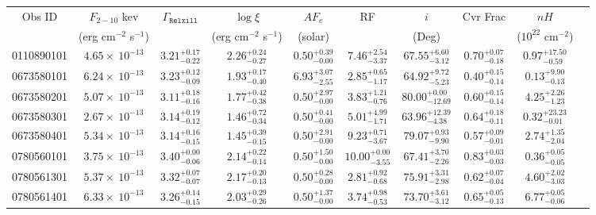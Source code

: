 \documentclass{article}
\begin{document}
\begin{landscape}
\begin{longtable}{cccccccccl}
\hline \multicolumn{1}{c}{Obs ID} & \multicolumn{1}{c}{$F_{2-10}$ kev} & \multicolumn{1}{c}{$\Gamma_\texttt{Relxill}$} & \multicolumn{1}{c}{$\log \xi$} & \multicolumn{1}{c}{$AF_e$} & \multicolumn{1}{c}{RF} & \multicolumn{1}{c}{$\textit{i}$} & \multicolumn{1}{c}{Cvr Frac} & \multicolumn{1}{c}{$nH$}\\  
\multicolumn{1}{c}{} & \multicolumn{1}{c}{(erg cm$^{-2}$ s$^{-1}$)} & \multicolumn{1}{c}{} & \multicolumn{1}{c}{(erg cm$^{-2}$ s$^{-1}$)} & \multicolumn{1}{c}{(solar)} & \multicolumn{1}{c}{} & \multicolumn{1}{c}{(Deg)} & \multicolumn{1}{c}{} & \multicolumn{1}{l}{($10^{22}$ cm$^{-2}$)}\\ \hline 
0110890101 & $4.65 \times~10^{-13}$ & $3.21^{+0.17}_{-0.22}$ & $2.26^{+0.24}_{-0.27}$ & $0.50^{+0.39}_{-0.00}$ & $7.46^{+2.54}_{-3.37}$ & $67.55^{+6.60}_{-3.12}$ &  $0.70^{+0.07}_{-0.18}$ &  $0.97^{+17.50}_{-0.59}$\\
0673580101 & $6.24 \times~10^{-13}$ & $3.23^{+0.12}_{-0.09}$ & $1.93^{+0.17}_{-0.40}$ & $6.93^{+3.07}_{-2.55}$ & $2.85^{+0.65}_{-1.17}$ & $64.92^{+9.72}_{-5.23}$ &  $0.40^{+0.15}_{-0.14}$ &  $0.13^{+9.90}_{-0.13}$\\
0673580201 & $5.07 \times~10^{-13}$ & $3.11^{+0.18}_{-0.16}$ & $1.77^{+0.42}_{-0.38}$ & $0.50^{+2.97}_{-0.00}$ & $3.83^{+1.21}_{-0.76}$ & $80.00^{+0.00}_{-12.69}$ &  $0.60^{+0.15}_{-0.14}$  &  $4.25^{+2.26}_{-1.23}$\\
0673580301 & $2.67 \times~10^{-13}$ & $3.14^{+0.19}_{-0.12}$ & $1.46^{+0.72}_{-0.34}$ & $0.50^{+0.41}_{-0.00}$ & $5.01^{+4.99}_{-1.71}$ & $63.96^{+12.39}_{-4.38}$ &  $0.64^{+0.18}_{-0.11}$  &  $0.32^{+23.23}_{-0.01}$ \\
0673580401 & $5.34 \times~10^{-13}$ & $3.14^{+0.16}_{-0.15}$ & $1.45^{+0.39}_{-0.15}$ & $0.50^{+2.91}_{-0.00}$ & $9.23^{+0.71}_{-3.67}$ & $79.07^{+0.93}_{-9.90}$ &  $0.57^{+0.09}_{-0.01}$ &  $2.74^{+1.35}_{-2.04}$ \\
0780560101 & $3.75 \times~10^{-13}$ & $3.40^{+0.00}_{-0.06}$ & $2.14^{+0.22}_{-0.14}$ & $0.50^{+1.50}_{-0.00}$ & $10.00^{+0.00}_{-3.55}$ & $67.41^{+3.70}_{-2.26}$ &  $0.83^{+0.03}_{-0.03}$ &  $0.36^{+0.05}_{-0.05}$  \\
0780561301 & $5.37 \times~10^{-13}$ & $3.32^{+0.07}_{-0.07}$ & $2.17^{+0.20}_{-0.13}$ & $0.50^{+0.28}_{-0.00}$ & $2.81^{+0.92}_{-0.68}$ & $75.91^{+3.31}_{-2.98}$ &  $0.62^{+0.07}_{-0.04}$ &  $4.60^{+2.02}_{-3.03}$  \\
0780561401 & $6.33 \times~10^{-13}$ & $3.26^{+0.14}_{-0.15}$ & $2.03^{+0.29}_{-0.26}$ & $0.50^{+1.37}_{-0.00}$ & $3.74^{+0.98}_{-0.53}$ & $73.70^{+3.61}_{-3.12}$ &  $0.65^{+0.05}_{-0.13}$ &  $6.77^{+0.05}_{-0.06}$  \\

\end{longtable}
\end{landscape}
\end{document}
